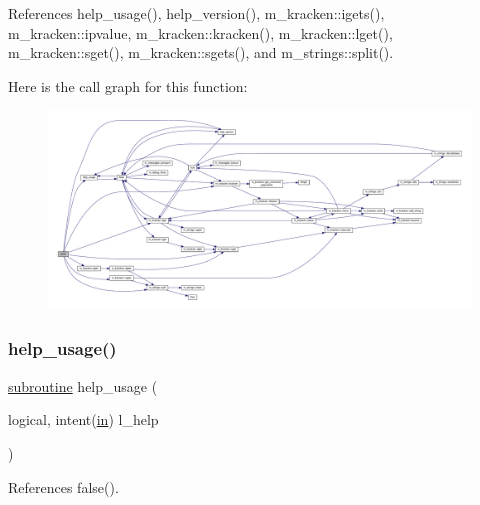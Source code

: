 References help\+\_\+usage(), help\+\_\+version(), m\+\_\+kracken\+::igets(), m\+\_\+kracken\+::ipvalue, m\+\_\+kracken\+::kracken(), m\+\_\+kracken\+::lget(), m\+\_\+kracken\+::sget(), m\+\_\+kracken\+::sgets(), and m\+\_\+strings\+::split().

Here is the call graph for this function\+:
\nopagebreak
\begin{figure}[H]
\begin{center}
\leavevmode
\includegraphics[width=350pt]{cprint_8f90_a24a9ebfa3b749c4ea01811ae635d6067_cgraph}
\end{center}
\end{figure}
\mbox{\label{cprint_8f90_a3e09a3b52ee8fb04eeb93fe5761626a8}} 
\subsubsection{\texorpdfstring{help\+\_\+usage()}{help\_usage()}}
{\footnotesize\ttfamily \hyperlink{M__stopwatch_83_8txt_acfbcff50169d691ff02d4a123ed70482}{subroutine} help\+\_\+usage (\begin{DoxyParamCaption}\item[{logical, intent(\hyperlink{M__journal_83_8txt_afce72651d1eed785a2132bee863b2f38}{in})}]{l\+\_\+help }\end{DoxyParamCaption})}



References false().


